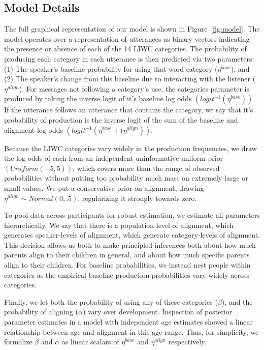 \documentclass[10pt,letterpaper]{article}
\begin{document}
\subsection{Model Details}

The full graphical representation of our model is shown in Figure~\ref{fig:model}. The model operates over a representation of utterances as binary vectors indicating the presence or absence of each of the 14 LIWC categories. The probability of producing each category in each utterance is then predicted via two parameters: (1) The speaker's baseline probability for using that word category ($\eta^{base}$), and (2) The speaker's change from this baseline due to interacting with the listener ($\eta^{align}$). For messages not following a category's use, the categories parameter is produced by taking the inverse logit of it's baseline log odds $\left(logit^{-1}\left(\eta^{base}\right)\right)$. If the utterance follows an utterance that contains the category, we say that it's probability of production is the inverse logit of the sum of the baseline and alignment log odds $\left(logit^{-1}\left(\eta^{base} + (\eta^{align}\right)\right)$.

Because the LIWC categories vary widely in the production frequencies, we draw the log odds of each from an independent uninformative uniform prior $\left(Uniform\left(-5,5\right)\right)$, which covers more than the range of observed probabilities without putting too probability much mass on extremely large or small values. We put a conservative prior on alignment, drawing $\eta^{align} \sim Normal(0,.5)$, regularizing it strongly towards zero.

To pool data across participants for robust estimation, we estimate all parameters hierarchically. We say that there is a population-level of alignment, which generates speaker-levels of alignment, which generate category-levels of alignment. This decision allows us both to make principled inferences both about how much parents align to their children in general, and about how much specific parents align to their children. For baseline probabilities, we instead nest people within categories as the empirical baseline production probabilities vary widely across categories.

Finally, we let both the probability of using any of these categories ($\beta$), and the probability of aligning ($\alpha$) vary over development. Inspection of posterior parameter estimates in a model with independent age estimates showed a linear relationship between age and alignment in this age range. Thus, for simplicity, we formalize $\beta$ and $\alpha$ as linear scalars of $\eta^{base}$ and $\eta^{align}$ respectively.
\end{document}
